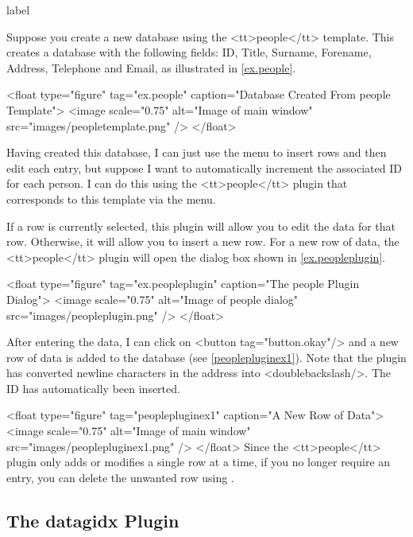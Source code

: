 \begin{example}{label}{}

   Suppose you create a new database using the <tt>people</tt>
   template. This creates a database with the following fields:
   ID, Title, Surname, Forename, Address, Telephone and Email, as
   illustrated in \autoref{ex.people}.

     <float type="figure" tag="ex.people" caption="Database Created From people Template">
      <image scale="0.75" alt="Image of main window" src="images/peopletemplate.png" />
     </float>

   Having created this database, I can just use the 
    menu to insert rows and then edit each entry,
   but suppose I want to automatically increment the associated ID
   for each person. I can do this using the <tt>people</tt> plugin 
   that corresponds to this template via the  menu.


   If a row is currently selected, this plugin will allow you to edit
   the data for that row. Otherwise, it will allow you to insert a new
   row. For a new row of data, the <tt>people</tt> plugin will open
   the dialog box shown in \autoref{ex.peopleplugin}.

     <float type="figure" tag="ex.peopleplugin" caption="The people Plugin Dialog">
      <image scale="0.75" alt="Image of people dialog" src="images/peopleplugin.png" />
     </float>

   After entering the data, I can click on <button tag="button.okay"/>
   and a new row of data is added to the database (see 
   \autoref{peoplepluginex1}). Note that the plugin has converted newline
   characters in the address into <doublebackslash/>. The ID has automatically 
   been inserted.

     <float type="figure" tag="peoplepluginex1" caption="A New Row of Data">
      <image scale="0.75" alt="Image of main window" src="images/peoplepluginex1.png" />
     </float>
   Since the <tt>people</tt> plugin only adds or modifies a single
   row at a time, if you no longer require an entry, you can delete the
   unwanted row using .
\end{example}

\subsection{The datagidx Plugin}\label{datagidxplugin}

